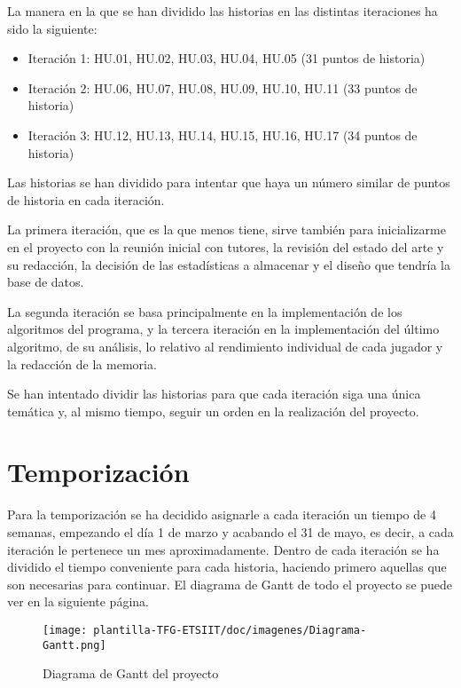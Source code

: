 La manera en la que se han dividido las historias en las distintas iteraciones ha sido la siguiente:
\begin{itemize}
    \item Iteración 1: HU.01, HU.02, HU.03, HU.04, HU.05 (31 puntos de historia)
    \item Iteración 2: HU.06, HU.07, HU.08, HU.09, HU.10, HU.11 (33 puntos de historia)
    \item Iteración 3: HU.12, HU.13, HU.14, HU.15, HU.16, HU.17 (34 puntos de historia)
    
\end{itemize}

Las historias se han dividido para intentar que haya un número similar de puntos de historia en cada iteración. 

La primera iteración, que es la que menos tiene, sirve también para inicializarme en el proyecto con la reunión inicial con tutores, la revisión del estado del  arte y su redacción, la decisión de las estadísticas a almacenar y el diseño que tendría la base de datos.

La segunda iteración se basa principalmente en la implementación de los algoritmos del programa, y la tercera iteración en la implementación del último algoritmo, de su análisis, lo relativo al rendimiento individual de cada jugador y la redacción de la memoria.

Se han intentado dividir las historias para que cada iteración siga una única temática y, al mismo tiempo, seguir un orden en la realización del proyecto.

\section{Temporización}
Para la temporización se ha decidido asignarle a cada iteración un tiempo de 4 semanas, empezando el día 1 de marzo y acabando el 31 de mayo, es decir, a cada iteración le pertenece un mes aproximadamente. Dentro de cada iteración se ha dividido el tiempo conveniente para cada historia, haciendo primero aquellas que son necesarias para continuar. El diagrama de Gantt de todo el proyecto se puede ver en la siguiente página.

\begin{figure}[p]
    \centering
    \begin{sideways}
        \texttt{[image: plantilla-TFG-ETSIIT/doc/imagenes/Diagrama-Gantt.png]}
    \end{sideways}
    \caption{Diagrama de Gantt del proyecto}
    \label{fig:imagen-ajustada}
\end{figure}

